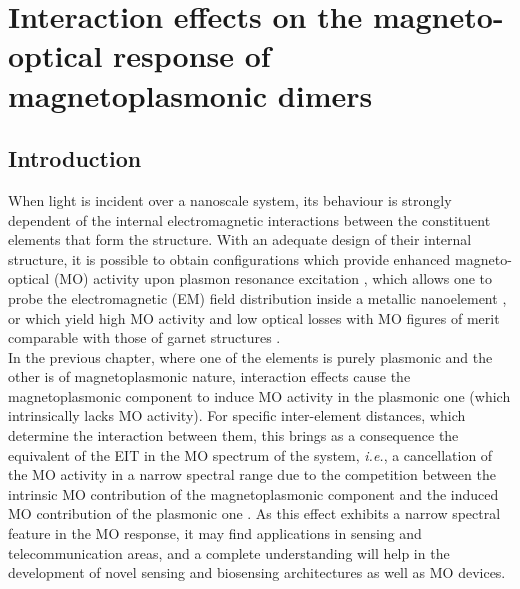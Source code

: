 \chapter{Interaction effects on the magneto-optical response of magnetoplasmonic dimers\label{chap4}}

\section{Introduction}

When light is incident over a nanoscale system, its behaviour is strongly dependent of the internal electromagnetic interactions between the constituent elements that form the structure. 
With an adequate design of their internal structure, it is possible to obtain configurations which provide enhanced magneto-optical (MO) activity upon plasmon resonance excitation \cite{gonzalez2008plasmonic,jain2009surface,wang2011plasmonics,marinchio2012light}, which allows one to probe the electromagnetic (EM) field distribution inside a metallic nanoelement  \cite{meneses2011probing}, or which yield high MO activity and low optical losses with MO figures of merit comparable with those of garnet structures \cite{banthi2012high}. \\
In the previous chapter, where one of the elements is purely plasmonic and the other is of magnetoplasmonic nature, interaction effects cause the magnetoplasmonic component to induce MO activity in the plasmonic one (which intrinsically lacks MO activity). For specific inter-element distances, which determine the interaction between them, this brings as a consequence the equivalent of the EIT in the MO spectrum of the system, \textit{i.e.}, a cancellation of the MO activity in a narrow spectral range due to the competition between the intrinsic MO contribution of the magnetoplasmonic component and the induced MO contribution of the plasmonic one \cite{armelles2013mimicking}. As this effect exhibits a narrow spectral feature in the MO response, it may find applications in sensing and telecommunication areas, and a complete understanding will help in the development of novel sensing and biosensing architectures as well as MO devices.\\

